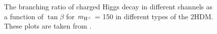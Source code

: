 \begin{figure}
\centering  
{}
\vfil
{}
\caption{The branching ratio of charged Higgs decay in different channels
	 as a function of $\tan\beta$ for $m_{\text{H}^+}$ = 150 \GeV in 
	different types of the 2HDM. These plots are taken from \cite{PhysRevD.80.015017}. }
\label{fig:brHqq}
\end{figure}

